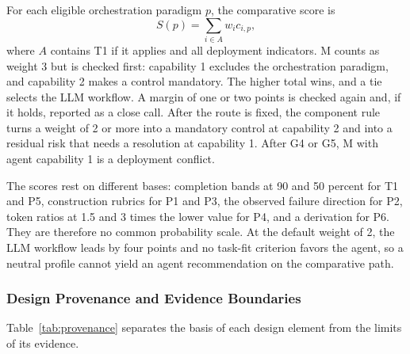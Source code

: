For each eligible orchestration paradigm \(p\), the comparative score is
\[
S(p)=\sum_{i\in A}w_i c_{i,p},
\]
where \(A\) contains T1 if it applies and all deployment indicators. M counts as weight 3 but is checked first: capability 1 excludes the orchestration paradigm, and capability 2 makes a control mandatory. The higher total wins, and a tie selects the LLM workflow. A margin of one or two points is checked again and, if it holds, reported as a close call. After the route is fixed, the component rule turns a weight of 2 or more into a mandatory control at capability 2 and into a residual risk that needs a resolution at capability 1. After G4 or G5, M with agent capability 1 is a deployment conflict.

The scores rest on different bases: completion bands at 90 and 50 percent for T1 and P5, construction rubrics for P1 and P3, the observed failure direction for P2, token ratios at 1.5 and 3 times the lower value for P4, and a derivation for P6. They are therefore no common probability scale. At the default weight of 2, the LLM workflow leads by four points and no task-fit criterion favors the agent, so a neutral profile cannot yield an agent recommendation on the comparative path.

\subsubsection{Design Provenance and Evidence Boundaries}
\label{app:artifact/provenance}

Table~\ref{tab:provenance} separates the basis of each design element from the limits of its evidence.

